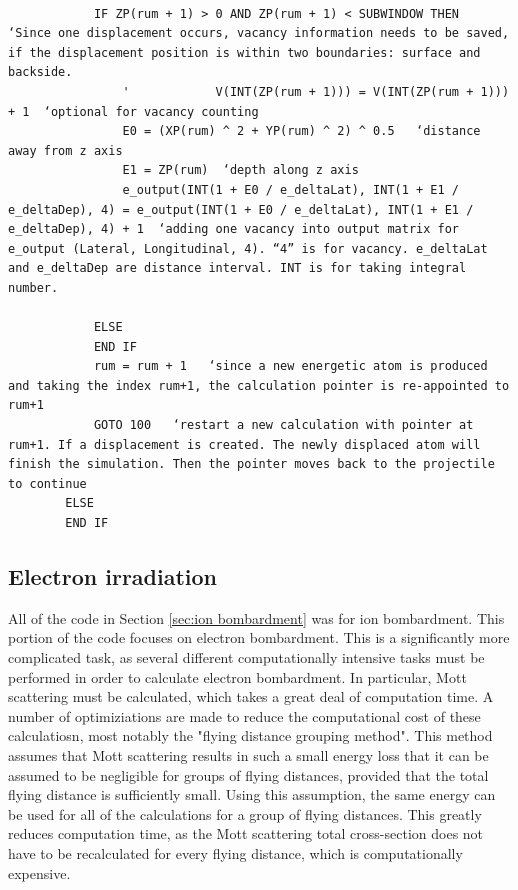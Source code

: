 \documentclass[10pt, reqno]{exam}
\begin{document}
\begin{verbatim}   

            IF ZP(rum + 1) > 0 AND ZP(rum + 1) < SUBWINDOW THEN  ‘Since one displacement occurs, vacancy information needs to be saved, if the displacement position is within two boundaries: surface and backside.
                '            V(INT(ZP(rum + 1))) = V(INT(ZP(rum + 1))) + 1  ‘optional for vacancy counting 
                E0 = (XP(rum) ^ 2 + YP(rum) ^ 2) ^ 0.5   ‘distance away from z axis
                E1 = ZP(rum)  ‘depth along z axis
                e_output(INT(1 + E0 / e_deltaLat), INT(1 + E1 / e_deltaDep), 4) = e_output(INT(1 + E0 / e_deltaLat), INT(1 + E1 / e_deltaDep), 4) + 1  ‘adding one vacancy into output matrix for e_output (Lateral, Longitudinal, 4). “4” is for vacancy. e_deltaLat and e_deltaDep are distance interval. INT is for taking integral number. 
    
            ELSE
            END IF
            rum = rum + 1   ‘since a new energetic atom is produced and taking the index rum+1, the calculation pointer is re-appointed to rum+1
            GOTO 100   ‘restart a new calculation with pointer at rum+1. If a displacement is created. The newly displaced atom will finish the simulation. Then the pointer moves back to the projectile to continue
        ELSE
        END IF
\end{verbatim}

\subsection{Electron irradiation}

All of the code in Section \ref{sec:ion bombardment} was for ion bombardment. This portion of the code focuses on electron bombardment. This is a significantly more complicated task, as several different computationally intensive tasks must be performed in order to calculate electron bombardment. In particular, Mott scattering must be calculated, which takes a great deal of computation time. A number of optimiziations are made to reduce the computational cost of these calculatiosn, most notably the "flying distance grouping method". This method assumes that Mott scattering results in such a small energy loss that it can be assumed to be negligible for groups of flying distances, provided that the total flying distance is sufficiently small. Using this assumption, the same energy can be used for all of the calculations for a group of flying distances. This greatly reduces computation time, as the Mott scattering total cross-section does not have to be recalculated for every flying distance, which is computationally expensive. \par 
\end{document}

